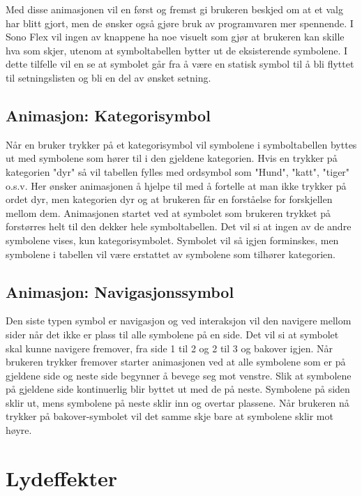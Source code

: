     Med disse animasjonen vil en først og fremst gi brukeren beskjed om at et valg har blitt gjort, men de ønsker også gjøre bruk av programvaren mer spennende.  I Sono Flex  vil ingen av knappene ha noe visuelt som gjør at brukeren kan skille hva som skjer, utenom at symboltabellen bytter ut de eksisterende symbolene. I dette tilfelle vil en se at symbolet går fra å være en statisk symbol til å bli flyttet til setningslisten og bli en del av ønsket setning. 



\subsection{Animasjon: Kategorisymbol}

Når en bruker trykker på et kategorisymbol vil symbolene i symboltabellen byttes ut med symbolene som hører til i den gjeldene kategorien. Hvis en trykker på kategorien "dyr" så vil tabellen fylles med ordsymbol som "Hund", "katt", "tiger" o.s.v. Her ønsker animasjonen å hjelpe til med å fortelle at man ikke trykker på ordet dyr, men kategorien dyr og at brukeren får en forståelse for forskjellen mellom dem. Animasjonen startet ved at symbolet som brukeren trykket på forstørres helt til den dekker hele symboltabellen. Det vil si at ingen av de andre symbolene vises, kun kategorisymbolet. Symbolet vil så igjen forminskes, men symbolene i tabellen vil være erstattet av symbolene som tilhører kategorien. 


\subsection{Animasjon: Navigasjonssymbol}


Den siste typen symbol er navigasjon og ved interaksjon vil den navigere mellom sider når det ikke er plass til alle symbolene på en side. Det vil si at symbolet skal kunne navigere fremover, fra side 1 til 2 og 2 til 3 og bakover igjen. Når brukeren trykker fremover starter animasjonen ved at alle symbolene som er på gjeldene side og neste side begynner å bevege seg mot venstre. Slik at symbolene på gjeldene side kontinuerlig blir byttet ut med de på neste. Symbolene på siden sklir ut, mens symbolene på neste sklir inn og overtar plassene. Når brukeren nå trykker på bakover-symbolet vil det samme skje bare at symbolene sklir mot høyre.



\section{Lydeffekter}

